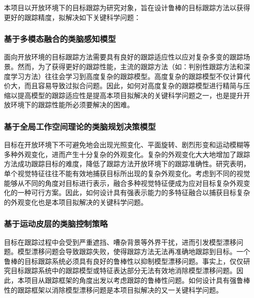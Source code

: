 \documentclass[a4paper,zihao=-4]{article}
\begin{document}
本项目以开放环境下的目标跟踪为研究对象，旨在设计鲁棒的目标跟踪方法以获得更好的跟踪精度，拟解决如下关键科学问题：

\subsubsection{基于多模态融合的类脑感知模型}
面向开放环境的目标跟踪方法需要具有良好的跟踪适应性以应对复杂多变的跟踪场景。然而，为了获得更好的跟踪性能，主流的跟踪方法（如：判别性跟踪方法和深度学习方法）往往会学习到高度复杂的跟踪模型。高度复杂的跟踪模型不仅计算代价大，而且容易导致过拟合问题。因此，如何对高度复杂的跟踪模型进行精简与压缩以提高模型的跟踪适应性是提高本项目拟解决的关键科学问题之一，也是提升开放环境下的跟踪性能所必须要解决的困难。

\subsubsection{基于全局工作空间理论的类脑规划决策模型}
目标在开放环境下不可避免地会出现光照变化、平面旋转、剧烈形变和运动模糊等多种外观变化，进而产生十分复杂的外观变化。复杂的外观变化大大地增加了跟踪方法成功跟踪目标的难度，降低了跟踪方法开放环境下的跟踪准确性。研究表明，单个视觉特征往往不能有效地捕获目标所出现的复杂外观变化。考虑到不同的视觉能够从不同的角度对目标进行表示，融合多种视觉特征便成为应对目标复杂外观变化的一种可行方案。因此，如何设计具有强表示能力的多特征融合以捕获目标复杂的外观变化也是本项目拟解决的关键科学问题。

\subsubsection{基于运动皮层的类脑控制策略}
目标在跟踪过程中会受到严重遮挡、嘈杂背景等外界干扰，进而引发模型漂移问题。模型漂移问题会导致跟踪失败，使得跟踪方法无法再准确地跟踪到目标。一个鲁棒的目标跟踪系统必须具有良好的鲁棒性以抑制模型漂移问题。事实上，仅仅研究目标跟踪系统中的跟踪模型或特征表达部分无法有效地消除模型漂移问题。因此，本项目从跟踪框架的角度出发以考虑跟踪的鲁棒性问题。如何设计具有强鲁棒性的跟踪框架以消除模型漂移问题是本项目拟解决的又一关键科学问题。





\end{document}
